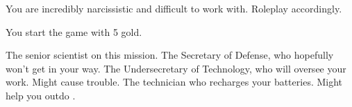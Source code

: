 \documentclass[char]{guildcamp3}
\begin{document}
\begin{itemz}[Notes]
	\item You are incredibly narcissistic and difficult to work with. Roleplay accordingly.  
	\item You start the game with 5 gold. 
\end{itemz}


\begin{contacts}
  \contact{\cSciOne{}} The senior scientist on this mission.
  \contact{\cPoliOne{}} The Secretary of Defense, who hopefully won't get in your way.
  \contact{\cPoliTwo{}} The Undersecretary of Technology, who will oversee your work. Might cause trouble.
  \contact{\cTech{}} The technician who recharges your batteries. Might help you outdo \cSciOne{}.
\end{contacts}
\end{document}
